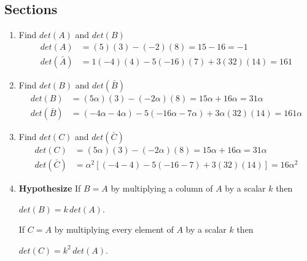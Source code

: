 \documentclass{article}
\begin{document}
    \subsection{Sections}
    \begin{enumerate}[label=(\alph*)]
      \item Find $det(A)$ and $det(B)$
            \begin{align*}
              det(A)&=(5)(3)-(-2)(8)=15-16=-1 \\
              det(\bar{A})&=1(-4)(4)-5(-16)(7)+3(32)(14)=161
            \end{align*}
      \item Find $det(B)$ and $det(\bar{B})$
            \begin{align*}
              det(B)&=(5\alpha)(3)-(-2\alpha)(8)=15\alpha+16\alpha=31\alpha \\
              det(\bar{B})&=(-4\alpha-4\alpha)-5(-16\alpha-7\alpha)+3\alpha(32)(14)=161\alpha
            \end{align*}
      \item Find $det(C)$ and $det(\bar{C})$
            \begin{align*}
              det(C)&=(5\alpha)(3)-(-2\alpha)(8)=15\alpha+16\alpha=31\alpha \\
              det(\bar{C})&=\alpha^{2}[(-4-4)-5(-16-7)+3(32)(14)]=16\alpha^{2}
            \end{align*}
      \item \textbf{Hypothesize}
            \newline
            If $B=A$ by multiplying a column of $A$ by a scalar $k$ then 
            \begin{center}
              $det(B)=k\,det(A)$.
            \end{center}
            If $C=A$ by multiplying every element of $A$ by a scalar $k$ then
            \begin{center}
              $det(C)=k^2\,det(A)$.
            \end{center}

    \end{enumerate}
\end{document}
